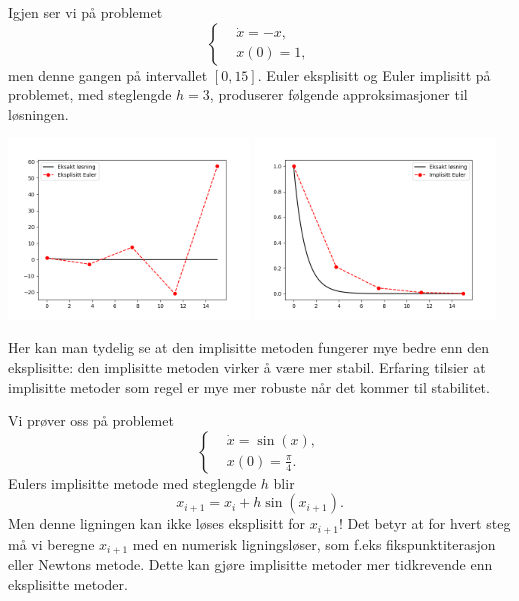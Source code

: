 \documentclass{article}
\theoremstyle{plain}
\theoremstyle{definition}
\theoremstyle{remark}
\newenvironment{ex}
{\pushQED{\qed}\renewcommand{\qedsymbol}{$\triangle$}\exx}
{\popQED\endexx}
\newcommand{\fcn}{x}
\begin{document}
\begin{ex}
    Igjen ser vi på problemet
    \begin{equation*}
        \left\{ 
            \begin{aligned}
                & \dot{\fcn} = - \fcn, \\
                & \fcn(0) = 1,
            \end{aligned}
        \right.
    \end{equation*}
    men denne gangen på intervallet $[0, 15]$. Euler eksplisitt og Euler implisitt på problemet, med steglengde $h = 3$, produserer følgende approksimasjoner til løsningen.
    \begin{center}
        \includegraphics[width=0.48\textwidth]{stability_test_explicit.png}
        \includegraphics[width=0.48\textwidth]{stability_test_implicit.png}
    \end{center}
    Her kan man tydelig se at den implisitte metoden fungerer mye bedre enn den eksplisitte: den implisitte metoden virker å være mer stabil. Erfaring tilsier at implisitte metoder som regel er mye mer robuste når det kommer til stabilitet.
\end{ex}

\begin{ex}
    Vi prøver oss på problemet
    \begin{equation*}
        \left\{
        \begin{aligned}
            & \dot{\fcn} = \sin(\fcn), \\
            & \fcn(0) = \frac{\pi}{4}.
        \end{aligned}
        \right.
    \end{equation*}
    Eulers implisitte metode med steglengde $h$ blir
    \begin{equation*}
        \fcn_{i + 1} = \fcn_i + h \sin(\fcn_{i+1}).
    \end{equation*}
    Men denne ligningen kan ikke løses eksplisitt for $\fcn_{i+1}$! Det betyr at for hvert steg må vi beregne $\fcn_{i+1}$ med en numerisk ligningsløser, som f.eks fikspunktiterasjon eller Newtons metode. Dette kan gjøre implisitte metoder mer tidkrevende enn eksplisitte metoder.
\end{ex}
\end{document}
